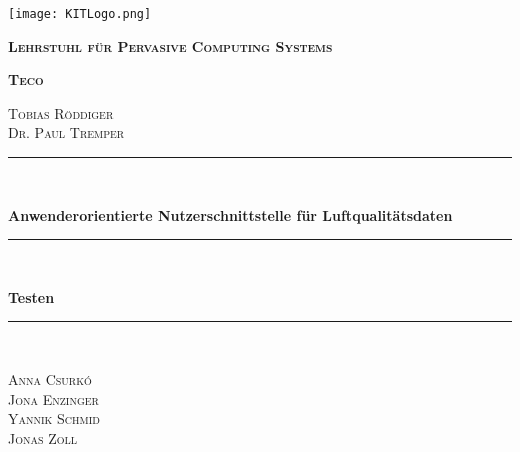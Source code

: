 \begin{titlepage}
    \centering
    \texttt{[image: KITLogo.png]}\par\vspace{1cm}
        {\scshape \bfseries Lehrstuhl für Pervasive Computing Systems\par}
        {\scshape \bfseries Teco\par}
        \vspace{0.25cm}
        {\scshape Tobias Röddiger\\Dr. Paul Tremper\par}
        \vspace{1.5cm}
  
      \newcommand{\HRule}{\rule{\linewidth}{0.5mm}}
      {\color{mintgreen}\HRule} \\[0.4cm]
        {\huge \bfseries \LARGE Anwenderorientierte Nutzerschnittstelle für Luftqualitätsdaten\par}
        {\color{mintgreen}\HRule} \\[0.4cm]
        {
            \huge \bfseries \LARGE Testen \par
        }
        {\color{mintgreen}\HRule} \\[1cm]
        \vspace{2cm}
        {\scshape \Large Anna Csurkó\\Jona Enzinger\\Yannik Schmid\\Jonas Zoll\par}
        \vfill
  
  \end{titlepage}
  
